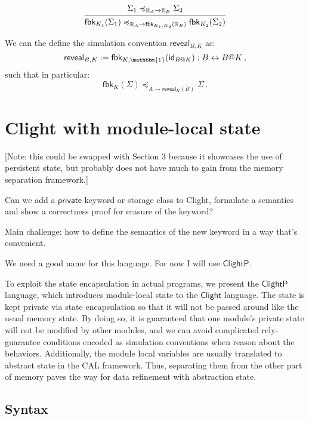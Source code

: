 \documentclass[acmsmall,screen,review,anonymous]{acmart}
\newcommand{\kw}[1]{\ensuremath{ \mathsf{#1} }}
\renewcommand{\preceq}{\preccurlyeq}
\newcommand{\ClightP}{\ensuremath{\mathsf{ClightP}}}
\begin{document}
\begin{lemma}
\[
  \begin{prooftree}
    \hypo{\Sigma_1 \preceq_{\mathbb{R}_A \rightarrow \mathbb{R}_B} \Sigma_2}
    \infer1{
      \kw{fbk}_{K_1}(\Sigma_1)
      \preceq_{\mathbb{R}_A \rightarrow \kw{fbk}_{K_1, K_2}(\mathbb{R}_B)}
      \kw{fbk}_{K_2}(\Sigma_2)}
  \end{prooftree}
\]
\end{lemma}

We can the define the simulation convention $\kw{reveal}_{B,K}$ as:
\[
  \kw{reveal}_{B,K} := \kw{fbk}_{K,\mathbbm{1}}(\kw{id}_{B@K}) : B \leftrightarrow B@K
  \,,
\]
such that in particular:
\[
  \kw{fbk}_K(\Sigma)
  \preceq_{A \rightarrow \kw{reveal}_K(B)}
  \Sigma
  \,.
\]



\section{Clight with module-local state} \label{sec:clightp} %

{
\color{gray}
[Note: this could be swapped with Section 3
because it showcases the use of persistent state,
but probably does not have much to gain
from the memory separation framework.]

Can we add a $\mathsf{private}$ keyword or storage class to Clight,
formulate a semantics and show a correctness proof
for erasure of the keyword?

Main challenge: how to define the semantics of the new keyword
in a way that's convenient.

We need a good name for this language.
For now I will use \ClightP{}.
}

To exploit the state encapsulation in actual programs,
we present the \ClightP{} language,
which introduces module-local state to the $\kw{Clight}$ language.
The state is kept private via state encapsulation
so that it will not be passed around like the usual memory state.
By doing so, it is guaranteed that
one module's private state will not be modified by other modules,
and we can avoid complicated rely-guarantee conditions
encoded as simulation conventions
when reason about the behaviors.
Additionally,
the module local variables are usually translated
to abstract state in the CAL framework.
Thus, separating them from the other part of memory
paves the way for data refinement with abstraction state.

\subsection{Syntax}
\end{document}
